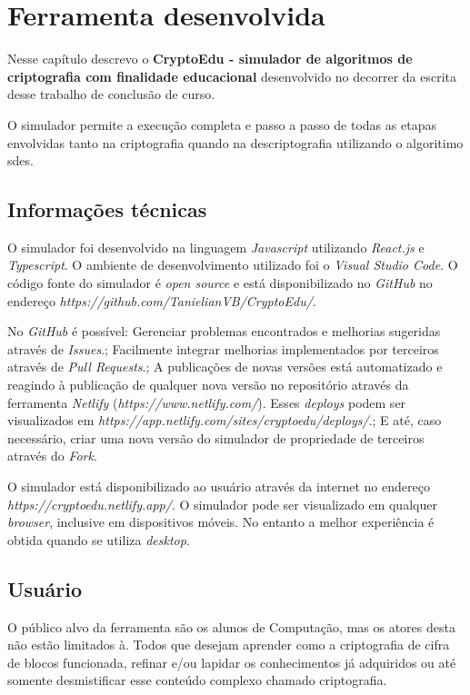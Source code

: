 \chapter{Ferramenta desenvolvida}
\label{char:ferrdesenvolvida}
Nesse capítulo descrevo o \textbf{CryptoEdu - simulador de algoritmos de criptografia com finalidade educacional} desenvolvido no decorrer da escrita desse trabalho de conclusão de curso.

O simulador permite a execução completa e passo a passo de todas as etapas envolvidas tanto na criptografia quando na descriptografia utilizando o algoritimo \acrfull{sdes}.

\section{Informações técnicas}

O simulador foi desenvolvido na linguagem \textit{Javascript} utilizando \textit{React.js} e \textit{Typescript}. O ambiente de desenvolvimento utilizado foi o \textit{Visual Studio Code}. O código fonte do simulador é \textit{open source} e está disponibilizado no \textit{GitHub} no endereço \textit{https://github.com/TanielianVB/CryptoEdu/}.

No \textit{GitHub} é possível: Gerenciar problemas encontrados e melhorias sugeridas através de \textit{Issues}.; Facilmente integrar melhorias implementados por terceiros através de \textit{Pull Requests}.; A publicações de novas versões está automatizado e reagindo à publicação de qualquer nova versão no repositório através da ferramenta \textit{Netlify} (\textit{https://www.netlify.com/}). Esses \textit{deploys} podem ser visualizados em \textit{https://app.netlify.com/sites/cryptoedu/deploys/}.; E até, caso necessário, criar uma nova versão do simulador de propriedade de terceiros através do \textit{Fork}.

O simulador está disponibilizado ao usuário através da internet no endereço \textit{https://cryptoedu.netlify.app/}. O simulador pode ser visualizado em qualquer \textit{browser}, inclusive em dispositivos móveis. No entanto a melhor experiência é obtida quando se utiliza \textit{desktop}.

\section{Usuário}
O público alvo da ferramenta são os alunos de Computação, mas os atores desta não estão limitados à. Todos que desejam aprender como a criptografia de cifra de blocos funcionada, refinar e/ou lapidar os conhecimentos já adquiridos ou até somente desmistificar esse conteúdo complexo chamado criptografia.

